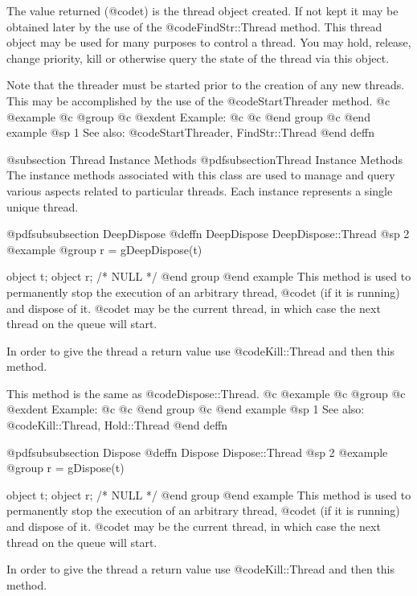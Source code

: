 The value returned (@code{t}) is the thread object created.  If not
kept it may be obtained later by the use of the @code{FindStr::Thread}
method.  This thread object may be used for many purposes to control
a thread.  You may hold, release, change priority, kill or otherwise
query the state of the thread via this object.

Note that the threader must be started prior to the creation of any new
threads.  This may be accomplished by the use of the @code{StartThreader}
method.  
@c @example
@c @group
@c @exdent Example:
@c 
@c @end group
@c @end example
@sp 1
See also:  @code{StartThreader, FindStr::Thread}
@end deffn



@subsection Thread Instance Methods
@pdfsubsection{Thread Instance Methods}
The instance methods associated with this class are used to manage and
query various aspects related to particular threads.  Each instance
represents a single unique thread.





@pdfsubsubsection {DeepDispose}
@deffn {DeepDispose} DeepDispose::Thread
@sp 2
@example
@group
r = gDeepDispose(t)

object  t;
object  r;     /*  NULL  */
@end group
@end example
This method is used to permanently stop the execution of an arbitrary
thread, @code{t} (if it is running) and dispose of it.  @code{t} may be
the current thread, in which case the next thread on the queue will
start.

In order to give the thread a return value use @code{Kill::Thread}
and then this method.

This method is the same as @code{Dispose::Thread}.
@c @example
@c @group
@c @exdent Example:
@c 
@c @end group
@c @end example
@sp 1
See also:  @code{Kill::Thread, Hold::Thread}
@end deffn







@pdfsubsubsection {Dispose}
@deffn {Dispose} Dispose::Thread
@sp 2
@example
@group
r = gDispose(t)

object  t;
object  r;     /*  NULL  */
@end group
@end example
This method is used to permanently stop the execution of an arbitrary
thread, @code{t} (if it is running) and dispose of it.  @code{t} may be
the current thread, in which case the next thread on the queue will
start.

In order to give the thread a return value use @code{Kill::Thread}
and then this method.

